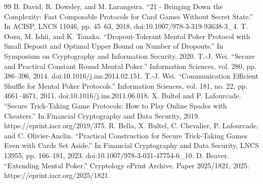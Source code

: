 \documentclass[11pt]{article}
\begin{document}
\begin{thebibliography}{99}
 B. David, R. Dowsley, and M. Larangeira. “21 - Bringing Down the Complexity: Fast Composable Protocols for Card Games Without Secret State.” In ACISP, LNCS 11046, pp. 45–63, 2018. doi:10.1007/978-3-319-93638-3\_4.
 T. Oozu, M. Ishii, and K. Tanaka. “Dropout-Tolerant Mental Poker Protocol with Small Deposit and Optimal Upper Bound on Number of Dropouts.” In Symposium on Cryptography and Information Security, 2020.
 T.-J. Wei. “Secure and Practical Constant Round Mental Poker.” Information Sciences, vol. 280, pp. 386–396, 2014. doi:10.1016/j.ins.2014.02.151.
 T.-J. Wei. “Communication Efficient Shuffle for Mental Poker Protocols.” Information Sciences, vol. 181, no. 22, pp. 4661–4671, 2011. doi:10.1016/j.ins.2011.06.018.
 X. Bultel and P. Lafourcade. “Secure Trick-Taking Game Protocols: How to Play Online Spades with Cheaters.” In Financial Cryptography and Data Security, 2019. https://eprint.iacr.org/2019/375.
 R. Bella, X. Bultel, C. Chevalier, P. Lafourcade, and C. Olivier-Anclin. “Practical Construction for Secure Trick-Taking Games Even with Cards Set Aside.” In Financial Cryptography and Data Security, LNCS 13955, pp. 166–181, 2023. doi:10.1007/978-3-031-47754-6\_10.
 D. Beaver. “Extending Mental Poker.” Cryptology ePrint Archive, Paper 2025/1821, 2025. https://eprint.iacr.org/2025/1821.
\end{thebibliography}
\end{document}
